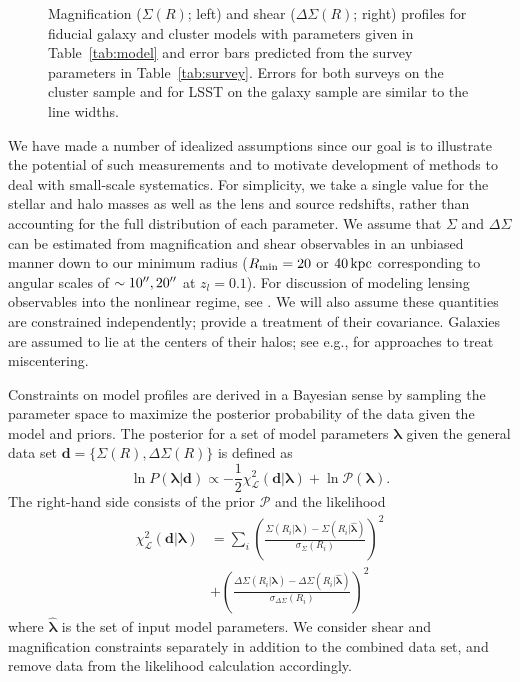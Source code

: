 \documentclass[12pt]{emulateapj}
\begin{document}
\begin{figure*}[htb]
\caption{Magnification ($\Sigma(R)$; left) and shear
  ($\Delta\Sigma(R)$; right) profiles for fiducial galaxy and cluster models with
  parameters given in Table~\ref{tab:model} and error bars predicted
  from the survey parameters in Table~\ref{tab:survey}. Errors for
  both surveys on the cluster sample and for LSST on the galaxy sample
are similar to the line widths.}
\label{fig:fiducial}
\end{figure*}


We have made a number of idealized assumptions since our goal is to
illustrate the potential of such measurements and to motivate
development of methods to deal with small-scale systematics. For
simplicity, we take a single value for the stellar and halo masses as well as
the lens and source redshifts, rather than accounting for the full
distribution of each parameter. We assume that $\Sigma$ and
$\Delta\Sigma$ can be estimated from magnification and shear
observables in an unbiased manner down to our minimum radius ($R_{\rm
  min} = 20$ or $40\,\rm{kpc}$ corresponding to angular scales of
$\sim10\mbox{$^{\prime\prime}$}, 20\mbox{$^{\prime\prime}$}$ at $z_l=0.1$). For discussion of modeling
lensing observables into the nonlinear regime, see \citet{Menard2003,
  Takada2003, Mandelbaum2006}. We will also assume these quantities
are constrained independently; \citet{Rozo2010} provide a treatment
of their covariance. Galaxies are assumed to lie at the centers of
their halos; see e.g., \citet{Johnston2007, George2012} for
approaches to treat miscentering.

Constraints on model profiles are derived in a Bayesian sense by
sampling the parameter space to maximize the posterior probability of
the data given the model and priors. The posterior for a set of model
parameters ${\bm \lambda}$ given the general data set ${\bm
  d}=\{\Sigma(R),\Delta\Sigma(R)\}$ is defined as 
\begin{equation}
\ln P({\bm \lambda}| {\bm d}) \propto
-\frac{1}{2}\chi^2_\mathcal{L}({\bm d}|{\bm \lambda}) + \ln{\mathcal P}({\bm \lambda}).
\end{equation}
The right-hand side consists of the prior ${\mathcal P}$ and the likelihood
\begin{equation}\begin{split}
\chi^2_{\mathcal L}({\bm d}|{\bm \lambda}) &=
\sum_{i}\left(\frac{\Sigma(R_i|{\bm \lambda}) -
      \Sigma(R_i|{\hat{\bm \lambda}})}{\sigma_{\Sigma}(R_i)}\right)^2 \\
&  + \left(\frac{\Delta\Sigma(R_i|{\bm \lambda}) -
      \Delta\Sigma(R_i|{\hat{\bm \lambda}})}{\sigma_{\Delta\Sigma}(R_i)}\right)^2
\end{split}\end{equation}
where $\hat{\bm \lambda}$ is the set of input model parameters. We
consider shear and magnification constraints separately in addition to
the combined data set, and remove data from the likelihood calculation
accordingly.
\end{document}
